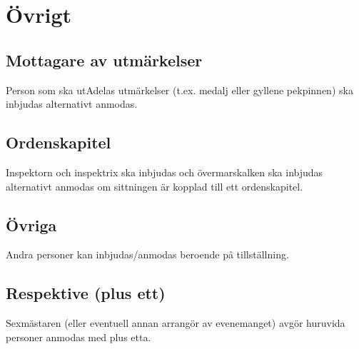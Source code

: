 \documentclass{dsekprotokoll}
\begin{document}
\section{Övrigt}

\subsection{Mottagare av utmärkelser}
Person som ska utAdelas utmärkelser (t.ex. medalj eller gyllene pekpinnen) ska inbjudas alternativt anmodas.

\subsection{Ordenskapitel}
Inspektorn och inspektrix ska inbjudas och övermarskalken
ska inbjudas alternativt anmodas om sittningen är kopplad
till ett ordenskapitel.

\subsection{Övriga}
Andra personer kan inbjudas/anmodas beroende på tillställning.

\subsection{Respektive (plus ett)}
Sexmästaren (eller eventuell annan arrangör av evenemanget) avgör huruvida personer anmodas med plus etta.
\end{document}
